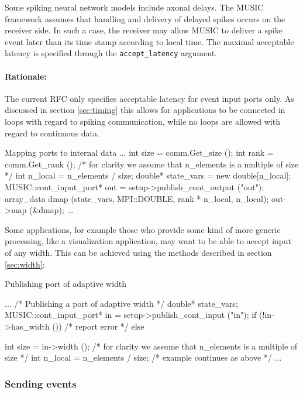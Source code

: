 \documentclass[a4paper]{report}
\newenvironment{rationale}%
{\par\paragraph{Rationale:}}%
{\par}
\begin{document}
Some spiking neural network models include axonal delays.  The MUSIC
framework assumes that handling and delivery of delayed spikes occurs
on the receiver side.  In such a case, the receiver may allow MUSIC to
deliver a spike event later than its time stamp according to local
time.  The maximal acceptable latency is specified through the
\lstinline|accept_latency| argument.
  
\begin{rationale}
The current RFC only specifies acceptable latency for event input
ports only.  As discussed in section \ref{sec:timing} this allows for
applications to be connected in loops with regard to spiking
communication, while no loops are allowed with regard to continuous
data.
\end{rationale}

\begin{code}{Mapping ports to internal data\label{code:mapping}}
{
  ...
  int size = comm.Get_size ();
  int rank = comm.Get_rank ();
  /* for clarity we assume that n_elements
     is a multiple of size */
  int n_local = n_elements / size;
  double* state_vars = new double[n_local];
  MUSIC::cont_input_port* out =
     setup->publish_cont_output ("out");
  array_data dmap (state_vars, MPI::DOUBLE,
                   rank * n_local, n_local);
  out->map (&dmap);
  ...
}
\end{code}

Some applications, for example those who provide some kind of more
generic processing, like a visualization application, may want to be
able to accept input of any width.  This can be achieved using the
methods described in section \ref{sec:width}:

\pagebreak
\begin{code}{Publishing port of adaptive width\label{code:adaptivewidth}}
{
  ...
  /* Publishing a port of adaptive width */
  double* state_vars;
  MUSIC::cont_input_port* in =
     setup->publish_cont_input ("in");
  if (!in->has_width ())
    /* report error */
  else
    {
      int size = in->width ();
      /* for clarity we assume that n_elements
         is a multiple of size */
      int n_local = n_elements / size;
      /* example continues as above */
      ...
      
    }
}
\end{code}

\subsubsection{Sending events}
\end{document}
